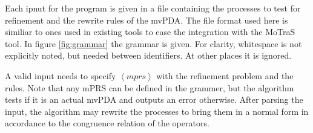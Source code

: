 Each ipnut for the program is given in a file containing the processes
to test for refinement and the rewrite rules of the mvPDA.
The file format used here is similiar to ones used in existing
tools \cite{Sickert12} to ease the integration with the MoTraS tool.
In figure \ref{fig:grammar} the grammar is given. For clarity,
whitespace is not explicitly noted, but needed between identifiers.
At other places it is ignored.

A valid input needs to specify $\left< mprs \right>$ with the refinement problem and
the rules.
Note that any mPRS can be defined in the grammer, but the algorithm
tests if it is an actual mvPDA and outputs an error otherwise.
After parsing the input, the algorithm may rewrite the processes
to bring them in a normal form in accordance to the congruence relation
of the operators.

